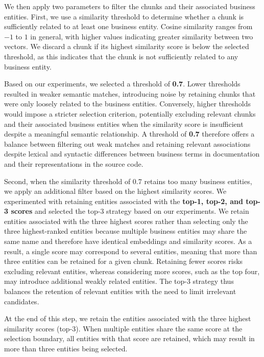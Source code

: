 We then apply two parameters to filter the chunks and their associated business entities. First, we use a similarity threshold to determine whether a chunk is sufficiently related to at least one business entity. Cosine similarity ranges from $-1$ to $1$ in general, with higher values indicating greater similarity between two vectors. We discard a chunk if its highest similarity score is below the selected threshold, as this indicates that the chunk is not sufficiently related to any business entity.

Based on our experiments, we selected a threshold of \textbf{0.7}. Lower thresholds resulted in weaker semantic matches, introducing noise by retaining chunks that were only loosely related to the business entities. Conversely, higher thresholds would impose a stricter selection criterion, potentially excluding relevant chunks and their associated business entities when the similarity score is insufficient despite a meaningful semantic relationship. A threshold of \textbf{0.7} therefore offers a balance between filtering out weak matches and retaining relevant associations despite lexical and syntactic differences between business terms in documentation and their representations in the source code.

Second, when the similarity threshold of 0.7 retains too many business entities, we apply an additional filter based on the highest similarity scores. We experimented with retaining entities associated with the \textbf{top-1, top-2, and top-3 scores} and selected the top-3 strategy based on our experiments. We retain entities associated with the three highest scores rather than selecting only the three highest-ranked entities because multiple business entities may share the same name and therefore have identical embeddings and similarity scores. As a result, a single score may correspond to several entities, meaning that more than three entities can be retained for a given chunk. Retaining fewer scores risks excluding relevant entities, whereas considering more scores, such as the top four, may introduce additional weakly related entities. The top-3 strategy thus balances the retention of relevant entities with the need to limit irrelevant candidates.

At the end of this step, we retain the entities associated with the three highest similarity scores (top-3). When multiple entities share the same score at the selection boundary, all entities with that score are retained, which may result in more than three entities being selected.

